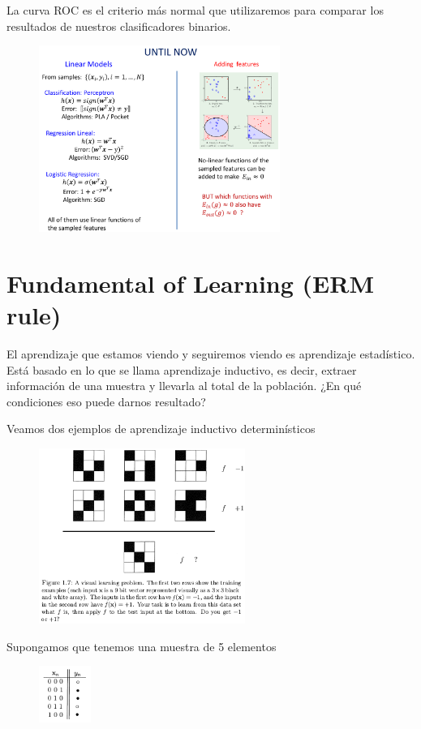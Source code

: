 \documentclass[11pt,a4paper]{article}
\theoremstyle{definition}
\begin{document}
	La curva ROC es el criterio más normal que utilizaremos para comparar los resultados de nuestros clasificadores binarios.
	
	\begin{figure}[H]
		\centering
		\includegraphics[width=0.7\textwidth]{images/until_now}
	\end{figure}
	\newpage
	
	\section{Fundamental of Learning (ERM rule)}
	El aprendizaje que estamos viendo y seguiremos viendo es aprendizaje estadístico. Está basado en lo que se llama aprendizaje inductivo, es decir, extraer información de una muestra y llevarla al total de la población. ¿En qué condiciones eso puede darnos resultado?
	
	Veamos dos ejemplos de aprendizaje inductivo determinísticos
	
	\begin{figure}[H]
		\centering
		\includegraphics[width=0.6\textwidth]{images/learning_not_feasible1}
	\end{figure}
	Supongamos que tenemos una muestra de 5 elementos
	\begin{figure}[H]
		\centering
		\includegraphics[width=0.15\textwidth]{images/learning_not_feasible2}
	\end{figure}
	
\end{document}
